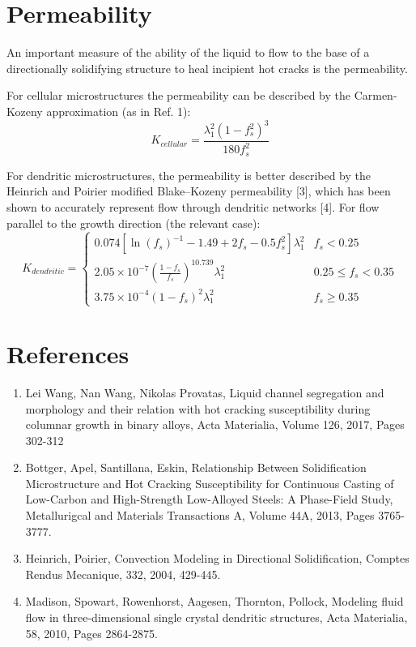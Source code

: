 \documentclass[11pt]{article}
\begin{document}
\section{Permeability}
An important measure of the ability of the liquid to flow to the base of a directionally solidifying structure to heal incipient hot cracks is the permeability.

For cellular microstructures the permeability can be described by the Carmen-Kozeny approximation (as in Ref. 1):
\begin{equation}
K_{cellular} = \frac{\lambda_1^2 (1-f_s^2)^3}{180f_s^2}
\end{equation}

For dendritic microstructures, the permeability is better described by the Heinrich and Poirier modified Blake–Kozeny permeability [3], which has been shown to accurately represent flow through dendritic networks [4]. For flow parallel to the growth direction (the relevant case):
\begin{equation}
K_{dendritic} = 
	\begin{cases}
	0.074 \left[ \ln (f_s)^{-1}-1.49+2 f_s - 0.5f_s^2 \right] \lambda_1^2 & f_s < 0.25 \\
	2.05 \times 10^{-7} \left( \frac{1-f_s}{f_s} \right)^{10.739} \lambda_1^2 & 0.25 \le f_s < 0.35 \\
	3.75 \times 10^{-4}(1-f_s)^2\lambda_1^2 & f_s \ge 0.35
	\end{cases}
\end{equation}

\section{References}
\begin{enumerate}
\item Lei Wang, Nan Wang, Nikolas Provatas, Liquid channel segregation and morphology and their relation with hot cracking susceptibility during columnar growth in binary alloys, Acta Materialia, Volume 126, 2017, Pages 302-312
\item Bottger, Apel, Santillana, Eskin, Relationship Between Solidification Microstructure and Hot Cracking Susceptibility for Continuous Casting of Low-Carbon and High-Strength Low-Alloyed Steels: A Phase-Field Study, Metallurigcal and Materials Transactions A, Volume 44A, 2013, Pages 3765-3777.
\item Heinrich, Poirier, Convection Modeling in Directional Solidification, Comptes Rendus Mecanique, 332, 2004, 429-445.
\item Madison, Spowart, Rowenhorst, Aagesen, Thornton, Pollock, Modeling fluid flow in three-dimensional single crystal dendritic structures, Acta Materialia, 58, 2010, Pages 2864-2875. 

\end{enumerate}
\end{document}
